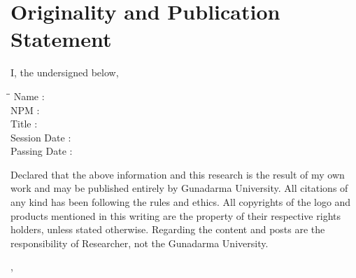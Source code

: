 \begingroup
\let\clearpage\relax
\let\cleardoublepage\relax

\chapter*{Originality and Publication Statement}
\label{chap:sig-statement}

I, the undersigned below,

\begin{tabbing}
\hspace*{3cm}\=\hspace*{0.5cm}\= \kill
Name \>:\> \myName \\
NPM \>:\> \myNPM \\
Title \>:\> \myDepTitle \\
Session Date \>:\> \myDateSession \\
Passing Date \>:\> \myDatePassing
\end{tabbing}

Declared that the above information and this research is the result of my own work and may be published entirely by Gunadarma University. All citations of any kind has been following the rules and ethics. All copyrights of the logo and products mentioned in this writing are the property of their respective rights holders, unless stated otherwise. Regarding the content and posts are the responsibility of Researcher, not the Gunadarma University.

\hfill

\begin{flushright}
\myCity, \myYearLast
\end{flushright}

\hfill

\begin{flushright}
\myName
\end{flushright}

\endgroup
